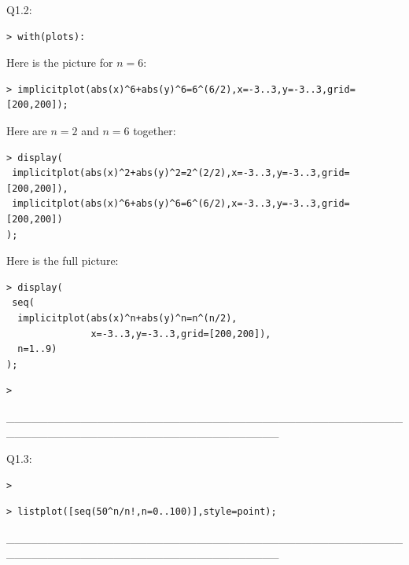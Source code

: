\documentclass{article}
\begin{document}
\begin{Maple Normal}

\end{Maple Normal}
\begin{Maple Normal}
Q1.2:
\end{Maple Normal}
\begin{lstlisting}
> with(plots):
\end{lstlisting}
\begin{Maple Normal}
Here is the picture for 
$n =6$:
\end{Maple Normal}
\begin{lstlisting}
> implicitplot(abs(x)^6+abs(y)^6=6^(6/2),x=-3..3,y=-3..3,grid=[200,200]);
\end{lstlisting}
\begin{Maple Normal}
Here are 
$n =2$ and 
$n =6$ together:
\end{Maple Normal}
\begin{lstlisting}
> display(
 implicitplot(abs(x)^2+abs(y)^2=2^(2/2),x=-3..3,y=-3..3,grid=[200,200]),
 implicitplot(abs(x)^6+abs(y)^6=6^(6/2),x=-3..3,y=-3..3,grid=[200,200])
);
\end{lstlisting}
\begin{Maple Normal}
Here is the full picture:
\end{Maple Normal}
\begin{lstlisting}
> display(
 seq(
  implicitplot(abs(x)^n+abs(y)^n=n^(n/2),
               x=-3..3,y=-3..3,grid=[200,200]),
  n=1..9)
);
\end{lstlisting}
\begin{lstlisting}
> 

\end{lstlisting}
\begin{Maple Normal}
\_\_\_\_\_\_\_\_\_\_\_\_\_\_\_\_\_\_\_\_\_\_\_\_\_\_\_\_\_\_\_\_\_\_\_\_\_\_\_\_\_\_\_\_\_\_\_\_\_\_\_\_\_\_\_\_\_\_\_\_\_\_\_\_\_\_\_\_\_\_\_\_\_\_\_\_\_\_\_\_\_
\end{Maple Normal}
\begin{Maple Normal}

\end{Maple Normal}
\begin{Maple Normal}
Q1.3:
\end{Maple Normal}
\begin{lstlisting}
> 
\end{lstlisting}
\begin{lstlisting}
> listplot([seq(50^n/n!,n=0..100)],style=point);
\end{lstlisting}
\begin{Maple Normal}
\_\_\_\_\_\_\_\_\_\_\_\_\_\_\_\_\_\_\_\_\_\_\_\_\_\_\_\_\_\_\_\_\_\_\_\_\_\_\_\_\_\_\_\_\_\_\_\_\_\_\_\_\_\_\_\_\_\_\_\_\_\_\_\_\_\_\_\_\_\_\_\_\_\_\_\_\_\_\_\_\_
\end{Maple Normal}
\end{document}
